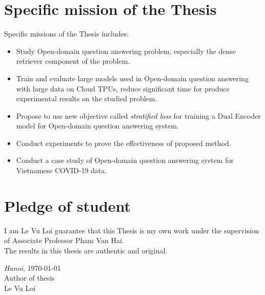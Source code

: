 \documentclass[12pt, sort&compress]{report}
\begin{document}
\section*{Specific mission of the Thesis}
\par Specific missions of the Thesis includes:
\begin{itemize}
	\item Study Open-domain question answering problem, especially the dense retriever component of the problem.
	\item Train and evaluate large models used in Open-domain question answering with large data on Cloud TPUs, reduce significant time for produce experimental results on the studied problem.
	\item Propose to use new objective called \textit{stratified loss} for training a Dual Encoder model for Open-domain question answering system.
	\item Conduct experiments to prove the effectiveness of proposed method.
	\item Conduct a case study of Open-domain question answering system for Vietnamese COVID-19 data.
\end{itemize}
\newpage
\section*{Pledge of student}
I am Le Vu Loi guarantee that this Thesis is my own work under the supervision of Associate Professor Pham Van Hai. \\
The results in this thesis are authentic and original.

\begin{minipage}{0.5\textwidth}
	\hspace{1pt}
\end{minipage}
\begin{minipage}[t]{0.5\textwidth}
	
	\begin{center}
		\textit{Hanoi}, \today \\
		Author of thesis\\[3cm]
		
		Le Vu Loi
	\end{center}
\end{minipage}
\end{document}

